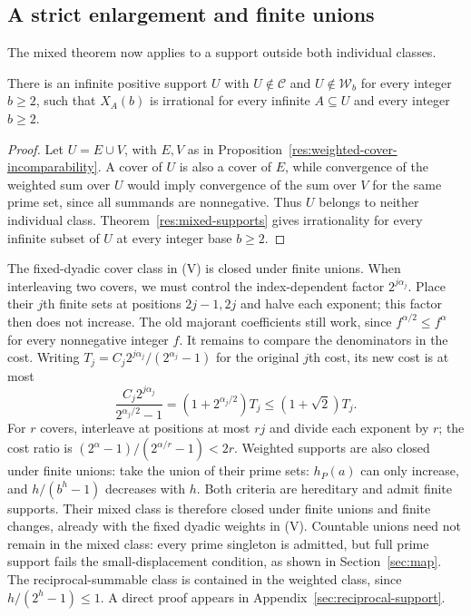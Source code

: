 \documentclass[11pt]{article}
\begin{document}
\subsection{A strict enlargement and finite unions}
The mixed theorem now applies to a support outside both individual
classes.
\begin{corollary}
\label{res:strict-mixed-supports}
There is an infinite positive support $U$ with
$U\notin\mathcal C$ and $U\notin\mathcal W_b$ for every integer $b\ge2$,
such that $X_A(b)$ is irrational for every infinite $A\subseteq U$
and every integer $b\ge2$.
\end{corollary}
\begin{proof}
Let $U=E\cup V$, with $E,V$ as in
Proposition~\ref{res:weighted-cover-incomparability}. A cover of $U$
is also a cover of $E$, while convergence of the weighted sum over $U$
would imply convergence of the sum over $V$ for the same prime set,
since all summands are nonnegative. Thus $U$
belongs to neither individual class. Theorem~\ref{res:mixed-supports}
gives irrationality for every infinite subset of $U$ at every integer
base $b\ge2$.
\end{proof}
The fixed-dyadic cover class in (V) is closed under finite unions.
When interleaving two covers, we must control the index-dependent
factor $2^{j\alpha_j}$. Place their $j$th finite sets at positions
$2j-1,2j$ and halve each exponent; this factor then does not increase.
The old majorant coefficients still work, since
$f^{\alpha/2}\le f^\alpha$ for every nonnegative integer $f$.
It remains to compare the denominators in the cost. Writing
$T_j=C_j2^{j\alpha_j}/(2^{\alpha_j}-1)$ for the original $j$th cost,
its new cost is at most
\[
 \frac{C_j2^{j\alpha_j}}{2^{\alpha_j/2}-1}
 =(1+2^{\alpha_j/2})T_j\le(1+\sqrt2)T_j.
\]
For $r$ covers, interleave at positions at most $rj$ and divide each
exponent by $r$; the cost ratio is
$(2^\alpha-1)/(2^{\alpha/r}-1)<2r$.  Weighted supports are also closed under finite unions: take the union
of their prime sets: $h_P(a)$ can only increase, and $h/(b^h-1)$
decreases with $h$.
Both criteria are hereditary and admit finite supports. Their mixed
class is therefore closed under finite unions and finite changes,
already with the fixed dyadic weights in (V).
Countable unions need not remain in the mixed class: every prime
singleton is admitted, but full prime support fails the small-displacement
condition, as shown in Section~\ref{sec:map}.
The reciprocal-summable class is contained in the weighted class, since
$h/(2^h-1)\le1$. A direct proof appears in
Appendix~\ref{sec:reciprocal-support}.
\end{document}
